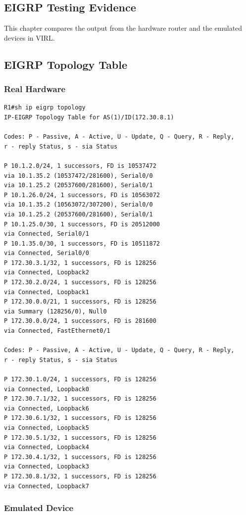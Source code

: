 \documentclass[11pt]{report}
\begin{document}
\begin{appendices}
\chapter{EIGRP Testing Evidence}

This chapter compares the output from the hardware router and the emulated devices in VIRL.

\section{EIGRP Topology Table}

\subsection{Real Hardware}
\begin{lstlisting}
R1#sh ip eigrp topology
IP-EIGRP Topology Table for AS(1)/ID(172.30.8.1)

Codes: P - Passive, A - Active, U - Update, Q - Query, R - Reply,
r - reply Status, s - sia Status

P 10.1.2.0/24, 1 successors, FD is 10537472
via 10.1.35.2 (10537472/281600), Serial0/0
via 10.1.25.2 (20537600/281600), Serial0/1
P 10.1.26.0/24, 1 successors, FD is 10563072
via 10.1.35.2 (10563072/307200), Serial0/0
via 10.1.25.2 (20537600/281600), Serial0/1
P 10.1.25.0/30, 1 successors, FD is 20512000
via Connected, Serial0/1
P 10.1.35.0/30, 1 successors, FD is 10511872
via Connected, Serial0/0
P 172.30.3.1/32, 1 successors, FD is 128256
via Connected, Loopback2
P 172.30.2.0/24, 1 successors, FD is 128256
via Connected, Loopback1
P 172.30.0.0/21, 1 successors, FD is 128256
via Summary (128256/0), Null0
P 172.30.0.0/24, 1 successors, FD is 281600
via Connected, FastEthernet0/1

Codes: P - Passive, A - Active, U - Update, Q - Query, R - Reply,
r - reply Status, s - sia Status

P 172.30.1.0/24, 1 successors, FD is 128256
via Connected, Loopback0
P 172.30.7.1/32, 1 successors, FD is 128256
via Connected, Loopback6
P 172.30.6.1/32, 1 successors, FD is 128256
via Connected, Loopback5
P 172.30.5.1/32, 1 successors, FD is 128256
via Connected, Loopback4
P 172.30.4.1/32, 1 successors, FD is 128256
via Connected, Loopback3
P 172.30.8.1/32, 1 successors, FD is 128256
via Connected, Loopback7

\end{lstlisting}

\subsection{Emulated Device}


\end{appendices}
\end{document}
